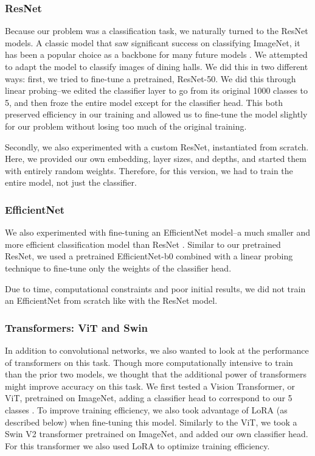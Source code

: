\documentclass{article}
\begin{document}
\begin{multicols}{2}
\subsubsection*{ResNet}

Because our problem was a classification task, we naturally turned to the ResNet models. A classic model that saw significant success on classifying ImageNet, it has been a popular choice as a backbone for many future models \cite{elharroussBackbonesReviewFeatureExtraction2022,heDeepResidualLearning2015}.  We attempted to adapt the model to classify images of dining halls. We did this in two different ways: first, we tried to fine-tune a pretrained, ResNet-50. We did this through linear probing–we edited the classifier layer to go from its original 1000 classes to 5, and then froze the entire model except for the classifier head. This both preserved efficiency in our training and allowed us to fine-tune the model slightly for our problem without losing too much of the original training.

Secondly, we also experimented with a custom ResNet, instantiated from scratch. Here, we provided our own embedding, layer sizes, and depths, and started them with entirely random weights. Therefore, for this version, we had to train the entire model, not just the classifier.

\subsubsection*{EfficientNet}
We also experimented with fine-tuning an EfficientNet model–a much smaller and more efficient classification model than ResNet \cite{tanEfficientNetRethinkingModel2020}. Similar to our pretrained ResNet, we used a pretrained EfficientNet-b0 combined with a linear probing technique to fine-tune only the weights of the classifier head.

Due to time, computational constraints and poor initial results, we did not train an EfficientNet from scratch like with the ResNet model.

\subsubsection*{Transformers: ViT and Swin}
In addition to convolutional networks, we also wanted to look at the performance of transformers on this task. Though more computationally intensive to train than the prior two models, we thought that the additional power of transformers might improve accuracy on this task. We first tested a Vision Transformer, or ViT, pretrained on ImageNet, adding a classifier head to correspond to our 5 classes \cite{dosovitskiyImageWorth16x162021}. To improve training efficiency, we also took advantage of LoRA (as described below) when fine-tuning this model.
Similarly to the ViT, we took a Swin V2 transformer \cite{liuSwinTransformerV22022} pretrained on ImageNet, and added our own classifier head. For this transformer we also used LoRA to optimize training efficiency.


\end{multicols}
\end{document}
